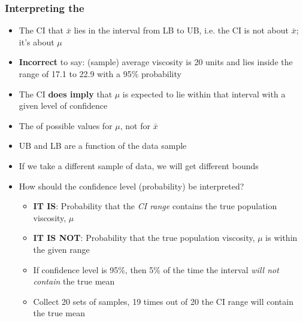\begin{frame}\frametitle{Interpreting the {\color{purple}{confidence interval (CI)}}}
	\begin{itemize}
		\item	The CI {} that $\bar{x}$ lies in the interval from LB to UB, i.e. the CI is not about $\bar{x}$; it's about $\mu$
		\item	\textbf{Incorrect} to say: (sample) average viscosity is 20 units and lies inside the range of 17.1 to 22.9 with a 95\% probability
		\item	The CI \textbf{does imply} that $\mu$ is expected to lie within that interval with a given level of confidence
		\item	The {} of possible values for $\mu$, not for $\bar{x}$
		\item	UB and LB are a function of the data sample
		\item	If we take a different sample of data, we will get different bounds
		\item	How should the confidence level (probability) be interpreted?
		\begin{itemize}
			\item	\textbf{IT IS}: Probability that the \emph{CI range} contains the true population viscosity, $\mu$
			\item	\textbf{IT IS NOT}: Probability that the true population viscosity, $\mu$ is within the given range {}
			\item	If confidence level is 95\%, then 5\% of the time the interval \emph{will not contain} the true mean
			\item	Collect 20 sets of samples, 19 times out of 20 the CI range will contain the true mean
		\end{itemize}
	\end{itemize}
\end{frame}

